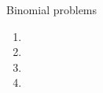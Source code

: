 Binomial problems
\begin{enumerate}
    \item
        
    \item
        
    \item
        
    \item
        
\end{enumerate}
